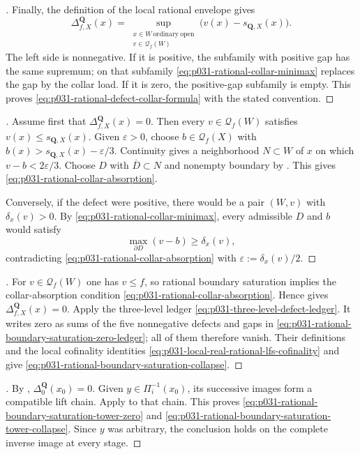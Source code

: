 \begin{proof}[]
Finally, the definition of the local rational envelope gives
\[
 \Delta^{\mathbf Q}_{f,X}(x)
   =\sup_{\substack{x\in W\ \mathrm{ordinary\ open}\\
                     v\in\mathcal Q_f(W)}}
          \bigl(v(x)-s_{\mathbf Q,X}(x)\bigr).
\]
The left side is nonnegative.  If it is positive, the subfamily with
positive gap has the same supremum; on that subfamily
\eqref{eq:p031-rational-collar-minimax} replaces the gap by the collar
load.  If it is zero, the positive-gap subfamily is empty.  This proves
\eqref{eq:p031-rational-defect-collar-formula} with the stated convention.
\end{proof}

\begin{proof}[]
Assume first that $\Delta^{\mathbf Q}_{f,X}(x)=0$.  Then every
$v\in\mathcal Q_f(W)$ satisfies $v(x)\leq s_{\mathbf Q,X}(x)$.  Given
$\varepsilon>0$, choose $b\in\mathcal Q_f(X)$ with
$b(x)>s_{\mathbf Q,X}(x)-\varepsilon/3$.  Continuity gives a neighborhood
$N\subset W$ of $x$ on which $v-b<2\varepsilon/3$.  Choose $D$ with
$\overline D\subset N$ and nonempty boundary by
.  This gives
\eqref{eq:p031-rational-collar-absorption}.

Conversely, if the defect were positive, there would be a pair $(W,v)$
with $\delta_x(v)>0$.  By
\eqref{eq:p031-rational-collar-minimax}, every admissible $D$ and $b$ would
satisfy
\[
                         \max_{\partial D}(v-b)\geq\delta_x(v),
\]
contradicting \eqref{eq:p031-rational-collar-absorption} with
$\varepsilon:=\delta_x(v)/2$.
\end{proof}

\begin{proof}[]
For $v\in\mathcal Q_f(W)$ one has $v\leq f$, so rational boundary
saturation implies the collar-absorption condition
\eqref{eq:p031-rational-collar-absorption}.  Hence
 gives
$\Delta^{\mathbf Q}_{f,X}(x)=0$.  Apply the three-level ledger
\eqref{eq:p031-three-level-defect-ledger}.  It writes zero as sums of the
five nonnegative defects and gaps in
\eqref{eq:p031-rational-boundary-saturation-zero-ledger}; all of them
therefore vanish.  Their definitions and the local cofinality identities
\eqref{eq:p031-local-real-rational-lfs-cofinality} and
 give
\eqref{eq:p031-rational-boundary-saturation-collapse}.
\end{proof}

\begin{proof}[]
By ,
$\Delta_0^{\mathbf Q}(x_0)=0$.  Given
$y\in\Pi_i^{-1}(x_0)$, its successive images form a compatible lift chain.
Apply  to that chain.
This proves \eqref{eq:p031-rational-boundary-saturation-tower-zero} and
\eqref{eq:p031-rational-boundary-saturation-tower-collapse}.  Since $y$
was arbitrary, the conclusion holds on the complete inverse image at every
stage.
\end{proof}

